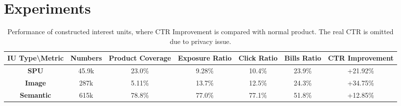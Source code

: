 \section{Experiments}



\begin{table*}[]
\caption{
Performance of constructed interest units, where CTR Improvement is compared with normal product. The real CTR is omitted due to privacy issue.
}
\label{tab:iuanalysis}
\begin{tabular}{ccccccc}
\midrule
\textbf{IU Type\textbackslash Metric} & \textbf{Numbers} & \textbf{Product Coverage} & \textbf{Exposure Ratio} & \textbf{Click Ratio} & 
\textbf{Bills Ratio} & \textbf{CTR Improvement} \\ \toprule
\textbf{SPU}                          & 45.9k            & 23.0\%                    & 9.28\%                  & 10.4\%       & 23.9\%           & +21.92\%                                     \\
\textbf{Image}                        & 287k            & 5.11\%                    & 13.7\%                  & 12.5\%        & 24.3\%        & +34.75\%                                     \\
\textbf{Semantic}                     & 615k            & 78.8\%                    & 77.0\%                  & 77.1\%      & 51.8\%            & +12.85\%                                     \\ \midrule
\end{tabular}
\end{table*}



